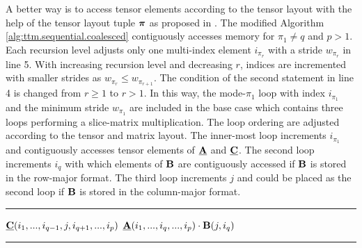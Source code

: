 A better way is to access tensor elements according to the tensor layout with the help of the tensor layout tuple $\boldsymbol{\pi}$ as proposed in \cite{bassoy:2018:fast}.
The modified Algorithm \ref{alg:ttm.sequential.coalesced} contiguously accesses memory for $\pi_1 \neq q$ and $p > 1$.
Each recursion level adjusts only one multi-index element $i_{\pi_r}$ with a stride $w_{\pi_r}$ in line 5.
With increasing recursion level and decreasing $r$, indices are incremented with smaller strides as $w_{\pi_r} \leq w_{\pi_{r+1}}$. 
The condition of the second  statement in line 4 is changed from $r \geq 1$ to $r > 1$.
In this way, the mode-$\pi_1$ loop with index $i_{\pi_1}$ and the minimum stride $w_{\pi_1}$ are included in the base case which contains three loops performing a slice-matrix multiplication. 
The loop ordering are adjusted according to the tensor and matrix layout.
The inner-most loop increments $i_{\pi_1}$ and contiguously accesses tensor elements of $\mubA$ and $\mubC$.
The second loop increments $i_q$ with which elements of $\mathbf{B}$ are contiguously accessed if $\mathbf{B}$ is stored in the row-major format.
The third loop increments $j$ and could be placed as the second loop if $\mathbf{B}$ is stored in the column-major format.

\begin{algorithm}[t]
\DontPrintSemicolon
{}
%
\footnotesize 
\SetAlgoVlined
\hrule
\BlankLine
{}
{
	{
	}
	{
		{
			\;
		}		
	}	
	\Else%
	{
		{
			{			
				{
					$\underline{\mathbf{C}}(i_1,...,i_{q-1},j,i_{q+1},...,i_{p})$ \ttt{+=} $\underline{\mathbf{A}}(i_1,...,i_q,...,i_p) \cdot \mathbf{B}(j,i_q)$\;
				}
			}
		}
	}
}
\BlankLine
\hrule
\caption{
\footnotesize %
Modified baseline algorithm with contiguous memory access for the tensor-matrix multiplication.
The tensor order must be greater than one and for the contraction mode $1 \leq q \leq p$ and $\pi_1 \neq q$ must hold.
The algorithm needs to be initially called with $r=p$ where $\mbn$ is the shape tuple of $\mubA$ and $m$ is the $q$-th dimension of $\mubC$. 
\label{alg:ttm.sequential.coalesced}
}
\end{algorithm}

